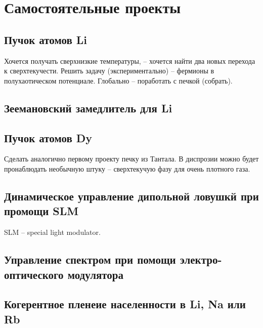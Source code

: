 
\newpage

\section{Самостоятельные проекты}

\subsection{Пучок атомов Li}
Хочется получать сверхнизкие температуры, -- хочется найти два новых перехода к сверхтекучести. 
Решить задачу (экспериментально) -- фермионы в полухаотическом потенциале. 
Глобально -- поработать с печкой (собрать).  




\subsection{Зеемановский замедлитель для Li}



\subsection{Пучок атомов Dy}

Сделать аналогично первому проекту печку из Тантала. В диспрозии можно будет пронаблюдать необычную штуку -- сверхтекучую фазу для очень плотного газа. 




\subsection{Динамическое управление дипольной ловушкй при промощи SLM}

SLM -- special light modulator. 




\subsection{Управление спектром при помощи электро-оптического модулятора}
% 


\subsection{Когерентное пленеие населенности в Li, Na или Rb}

